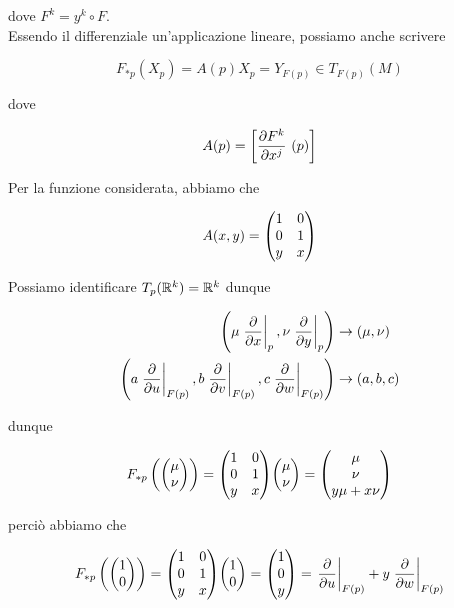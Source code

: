 dove $ F^{k} = y^{k} \circ F $.\\
Essendo  il differenziale un'applicazione lineare, possiamo anche scrivere

\begin{equation}
	F_{*p} (X_{p}) = A(p) X_{p} = Y_{F(p)} \in T_{F(p)}(M)
\end{equation}

dove

\begin{equation}
	A(p) = \left[ \pdv{F^{k}}{x^{j}}\ (p) \right]
\end{equation}

Per la funzione considerata, abbiamo che

\begin{equation}
	A(x,y) = \mqty( 1 & 0 \\ 0 & 1 \\ y & x )
\end{equation}

Possiamo identificare $ T_{p}(\mathbb{R}^{k}) = \mathbb{R}^{k} $ dunque

\begin{align}
	\begin{split}
		\left( \mu \eval{\pdv{x}}_{p}, \nu \eval{\pdv{y}}_{p} \right) &\to (\mu,\nu)\\
		\left( a \eval{\pdv{u}}_{F(p)}, b \eval{\pdv{v}}_{F(p)}, c \eval{\pdv{w}}_{F(p)} \right) &\to (a,b,c)
	\end{split}
\end{align}

dunque

\begin{equation}
	F_{*p} \left( \mqty( \mu \\ \nu ) \right) = \mqty( 1 & 0 \\ 0 & 1 \\ y & x ) \mqty( \mu \\ \nu ) = \mqty( \mu \\ \nu \\ y \mu + x \nu )
\end{equation}

perciò abbiamo che

\begin{equation}
	F_{*p} \left( \mqty( 1 \\ 0 ) \right) = \mqty( 1 & 0 \\ 0 & 1 \\ y & x ) \mqty( 1 \\ 0 ) = \mqty( 1 \\ 0 \\ y ) = \eval{\pdv{u}}_{F(p)} + y \eval{\pdv{w}}_{F(p)}
\end{equation}

